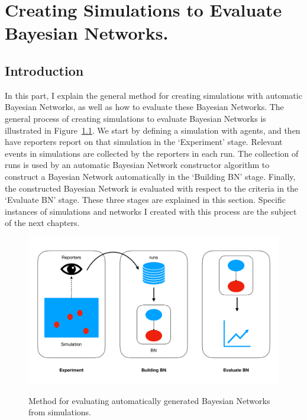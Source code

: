  

\chapter[Simulations to Evaluate Bayesian Networks.]{Creating Simulations to Evaluate Bayesian Networks.}

\section{Introduction}

In this part, I explain the general method for creating simulations with automatic Bayesian Networks, as well as how to evaluate these Bayesian Networks. The general process of creating simulations to evaluate Bayesian Networks is illustrated in Figure~\ref{pipeline}. We start by defining a simulation with agents, and then have reporters report on that simulation in the `Experiment' stage. Relevant events in simulations are collected by the reporters in each run. The collection of runs is used by an automatic Bayesian Network constructor algorithm to construct a Bayesian Network automatically in the `Building BN' stage. Finally, the constructed Bayesian Network is evaluated with respect to the criteria in the `Evaluate BN' stage. These three stages are explained in this section. Specific instances of simulations and networks I created with this process are the subject of the next chapters.

\begin{figure}[h]
\includegraphics[width=\linewidth]{images/pipeline.pdf}
\label{pipeline}
\caption{Method for evaluating automatically generated Bayesian Networks from simulations.}
\end{figure}


